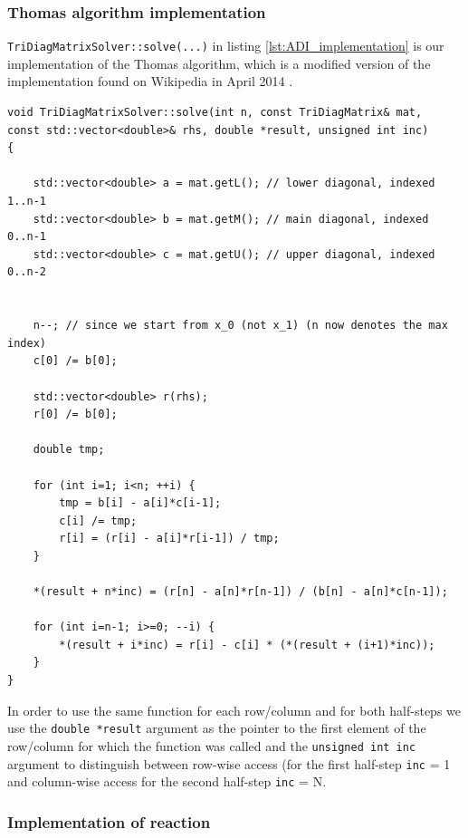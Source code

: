 \documentclass[11pt,a4paper]{article} %
\begin{document}
\subsubsection{Thomas algorithm implementation}

\texttt{TriDiagMatrixSolver::solve(...)} in listing \ref{lst:ADI_implementation} is our implementation of the Thomas algorithm, which is a modified version of the implementation found on Wikipedia in April 2014 \cite{wiki:thomas-alg}. 

\begin{center}
\begin{verbatim}
void TriDiagMatrixSolver::solve(int n, const TriDiagMatrix& mat, 
const std::vector<double>& rhs, double *result, unsigned int inc)
{
   
    std::vector<double> a = mat.getL(); // lower diagonal, indexed 1..n-1
    std::vector<double> b = mat.getM(); // main diagonal, indexed 0..n-1
    std::vector<double> c = mat.getU(); // upper diagonal, indexed 0..n-2
    
    
    n--; // since we start from x_0 (not x_1) (n now denotes the max index)
    c[0] /= b[0];
    
    std::vector<double> r(rhs);
    r[0] /= b[0];
    
    double tmp;

    for (int i=1; i<n; ++i) {
        tmp = b[i] - a[i]*c[i-1];
        c[i] /= tmp;
        r[i] = (r[i] - a[i]*r[i-1]) / tmp;
    }

    *(result + n*inc) = (r[n] - a[n]*r[n-1]) / (b[n] - a[n]*c[n-1]);

    for (int i=n-1; i>=0; --i) {
        *(result + i*inc) = r[i] - c[i] * (*(result + (i+1)*inc));
    }
}
\end{verbatim}
\end{center}
In order to use the same function for each row/column and for both half-steps we use the \texttt{double *result} argument as the pointer to the first element of the row/column for which the function was called and the \texttt{unsigned int inc} argument to distinguish between row-wise access (for the first half-step \texttt{inc} = 1 and column-wise access for the second half-step \texttt{inc} = N.

\subsubsection{Implementation of reaction}
\end{document}

